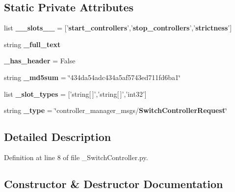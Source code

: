 \subsection*{\-Static \-Private \-Attributes}
\begin{DoxyCompactItemize}
\item 
list {\bf \-\_\-\-\_\-slots\-\_\-\-\_\-} = ['{\bf start\-\_\-controllers}','{\bf stop\-\_\-controllers}','{\bf strictness}']
\item 
string {\bf \-\_\-full\-\_\-text}
\item 
{\bf \-\_\-has\-\_\-header} = \-False
\item 
string {\bf \-\_\-md5sum} = \char`\"{}434da54adc434a5af5743ed711fd6ba1\char`\"{}
\item 
list {\bf \-\_\-slot\-\_\-types} = ['string[$\,$]','string[$\,$]','int32']
\item 
string {\bf \-\_\-type} = \char`\"{}controller\-\_\-manager\-\_\-msgs/{\bf \-Switch\-Controller\-Request}\char`\"{}
\end{DoxyCompactItemize}


\subsection{\-Detailed \-Description}


\-Definition at line 8 of file \-\_\-\-Switch\-Controller.\-py.



\subsection{\-Constructor \& \-Destructor \-Documentation}
